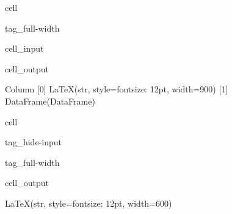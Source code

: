 \documentclass[letterpaper,10pt,english]{jupyterBook}
\begin{document}
\begin{sphinxuseclass}{cell}
\begin{sphinxuseclass}{tag_full-width}
\begin{sphinxVerbatimInput}
\begin{sphinxuseclass}{cell_input}
\begin{sphinxVerbatim}[commandchars=\\\{\}]
      
               

  

 
\end{sphinxVerbatim}

\end{sphinxuseclass}\end{sphinxVerbatimInput}
\begin{sphinxVerbatimOutput}

\begin{sphinxuseclass}{cell_output}
\begin{sphinxVerbatim}[commandchars=\\\{\}]
Column
    [0] LaTeX(str, style=\PYGZob{}\PYGZsq{}font\PYGZhy{}size\PYGZsq{}: \PYGZsq{}12pt\PYGZsq{}\PYGZcb{}, width=900)
    [1] DataFrame(DataFrame)
\end{sphinxVerbatim}

\end{sphinxuseclass}\end{sphinxVerbatimOutput}

\end{sphinxuseclass}
\end{sphinxuseclass}
\begin{sphinxuseclass}{cell}
\begin{sphinxuseclass}{tag_hide-input}
\begin{sphinxuseclass}{tag_full-width}\begin{sphinxVerbatimOutput}

\begin{sphinxuseclass}{cell_output}
\begin{sphinxVerbatim}[commandchars=\\\{\}]
LaTeX(str, style=\PYGZob{}\PYGZsq{}font\PYGZhy{}size\PYGZsq{}: \PYGZsq{}12pt\PYGZsq{}\PYGZcb{}, width=600)
\end{sphinxVerbatim}

\end{sphinxuseclass}\end{sphinxVerbatimOutput}

\end{sphinxuseclass}
\end{sphinxuseclass}
\end{sphinxuseclass}
\end{document}
